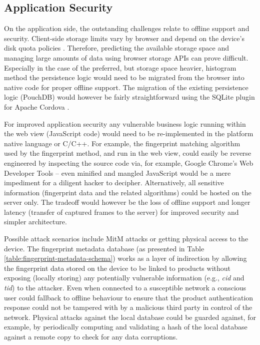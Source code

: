 \documentclass[thesis.tex]{subfiles}
\begin{document}
\subsection{Application Security}
\enlargethispage{1\baselineskip}

On the application side, the outstanding challenges relate to offline support and security. Client-side storage limits vary by browser and depend on the device's disk quota policies \cite{mobile-browser-quota}. Therefore, predicting the available storage space and managing large amounts of data using browser storage APIs can prove difficult. Especially in the case of the preferred, but storage space heavier, histogram method the persistence logic would need to be migrated from the browser into native code for proper offline support. The migration of the existing persistence logic (PouchDB) would however be fairly straightforward using the SQLite plugin for Apache Cordova \cite{apache-cordova-sqlite}.

For improved application security any vulnerable business logic running within the web view (JavaScript code) would need to be re-implemented in the platform native language or C/C++. For example, the fingerprint matching algorithm used by the fingerprint method, and run in the web view, could easily be reverse engineered by inspecting the source code via, for example, Google Chrome's Web Developer Tools -- even minified and mangled JavaScript would be a mere impediment for a diligent hacker to decipher. Alternatively, all sensitive information (fingerprint data and the related algorithms) could be hosted on the server only. The tradeoff would however be the loss of offline support and longer latency (transfer of captured frames to the server) for improved security and simpler architecture.

Possible attack scenarios include MitM attacks or getting physical access to the device. The fingerprint metadata database (as presented in Table \ref{table:fingerprint-metadata-schema}) works as a layer of indirection by allowing the fingerprint data stored on the device to be linked to products without exposing (locally storing) any potentially vulnerable information (e.g., \emph{cid} and \emph{tid}) to the attacker. Even when connected to a susceptible network a conscious user could fallback to offline behaviour to ensure that the product authentication response could not be tampered with by a malicious third party in control of the network. Physical attacks against the local database could be guarded against, for example, by periodically computing and validating a hash of the local database against a remote copy to check for any data corruptions.
\end{document}
